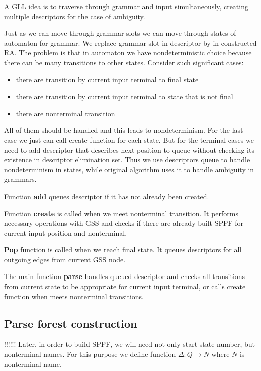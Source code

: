 \documentclass[runningheads,a4paper]{llncs}
\begin{document}
A GLL idea is to traverse through grammar and input simultaneously, creating multiple descriptors for the case of ambiguity.

Just as we can move through grammar slots we can move through states of automaton for grammar.
We replace grammar slot in descriptor by in constructed RA.
The problem is that in automaton we have nondeterministic choice because there can be many transitions to other states.
Consider such significant cases:

\begin{itemize} 
\item there are transition by current input terminal to final state
\item there are transition by current input terminal to state that is not final
\item there are nonterminal transition
\end{itemize}

All of them should be handled and this leads to nondeterminism. 
For the last case we just can call create function for each state.
But for the terminal cases we need to add descriptor that describes next position to queue without checking its existence in descriptor elimination set.
Thus we use descriptors queue to handle nondeterminism in states, while original algorithm uses it to handle ambiguity in grammars.



Function \textbf{add} queues descriptor if it has not already been created.



Function \textbf{create} is called when we meet nonterminal transition.
It performs necessary operations with GSS and checks if there are already built SPPF for current
input position and nonterminal.



\textbf{Pop} function is called when we reach final state. It queues descriptors for all outgoing edges from current GSS node.



The main function \textbf{parse} handles queued descriptor and checks all transitions from current state to be appropriate
for current input terminal, or calls create function when meets nonterminal transitions.


\subsection{Parse forest construction}
!!!!!!
Later, in order to build SPPF, we will need not only start state number, but nonterminal names.
For this purpose we define function $\Delta : Q \to N$ where $N$ is nonterminal name.
\end{document}
